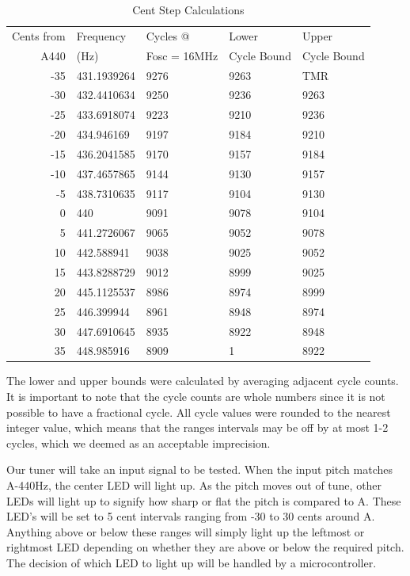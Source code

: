 \documentclass[12pt]{article}
\begin{document}
\begin{table}
   \centering
    \begin{tabular}{|r|l|l|l|l|}
        \hline
        Cents from & Frequency& Cycles @ & Lower & Upper \\
        A440 & (Hz) & Fosc = 16MHz & Cycle Bound & Cycle Bound \\ \hline
       -35 & 431.1939264 & 9276 & 9263 & TMR \\ \hline
       -30 & 432.4410634 & 9250 & 9236 & 9263 \\ \hline
       -25 & 433.6918074 & 9223 & 9210 & 9236 \\ \hline
       -20 & 434.946169 & 9197 & 9184 & 9210 \\ \hline
       -15 & 436.2041585 & 9170 & 9157 & 9184 \\ \hline
       -10 & 437.4657865 & 9144 & 9130 & 9157 \\ \hline
       -5 & 438.7310635 & 9117 & 9104 & 9130 \\ \hline
       0 & 440 & 9091 & 9078 & 9104 \\ \hline
       5 & 441.2726067 & 9065 & 9052 & 9078 \\ \hline
       10 & 442.588941 & 9038 & 9025 & 9052 \\ \hline
       15 & 443.8288729 & 9012 & 8999 & 9025 \\ \hline
       20 & 445.1125537 & 8986 & 8974 & 8999 \\ \hline
       25 & 446.399944 & 8961 & 8948 & 8974 \\ \hline
       30 & 447.6910645 & 8935 & 8922 & 8948 \\ \hline
       35 & 448.985916 & 8909 & 1 & 8922 \\ \hline
    \end{tabular}
	\caption{Cent Step Calculations}
	\label{Freq_Table} 
\end{table}

The lower and upper bounds were calculated by averaging adjacent cycle counts. It is important to
note that the cycle counts are whole numbers since it is not possible to have a fractional cycle. All cycle
values were rounded to the nearest integer value, which means that the ranges intervals may be off by
at most 1-2 cycles, which we deemed as an acceptable imprecision.



Our tuner will take an input signal to be tested. When the input pitch matches A-440Hz, the
center LED will light up. As the pitch moves out of tune, other LEDs will light up to signify how sharp or
flat the pitch is compared to A. These LED's will be set to 5 cent intervals ranging from -30 to 30 cents
around A. Anything above or below these ranges will simply light up the leftmost or rightmost LED
depending on whether they are above or below the required pitch. The decision of which LED to light up
will be handled by a microcontroller.
\end{document}
